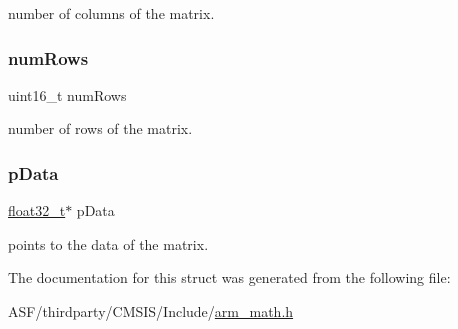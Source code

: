 number of columns of the matrix. \mbox{\label{structarm__matrix__instance__f32_a1bcf80ccdc2acc29198f1592ae300390}} 
\subsubsection{\texorpdfstring{numRows}{numRows}}
{\footnotesize\ttfamily uint16\+\_\+t num\+Rows}

number of rows of the matrix. \mbox{\label{structarm__matrix__instance__f32_af5c3a2f15c98850cdcfbe6f87e5ac5df}} 
\subsubsection{\texorpdfstring{pData}{pData}}
{\footnotesize\ttfamily \mbox{\hyperlink{arm__math_8h_a4611b605e45ab401f02cab15c5e38715}{float32\+\_\+t}}$\ast$ p\+Data}

points to the data of the matrix. 

The documentation for this struct was generated from the following file\+:\begin{DoxyCompactItemize}
\item 
A\+S\+F/thirdparty/\+C\+M\+S\+I\+S/\+Include/\mbox{\hyperlink{arm__math_8h}{arm\+\_\+math.\+h}}\end{DoxyCompactItemize}
